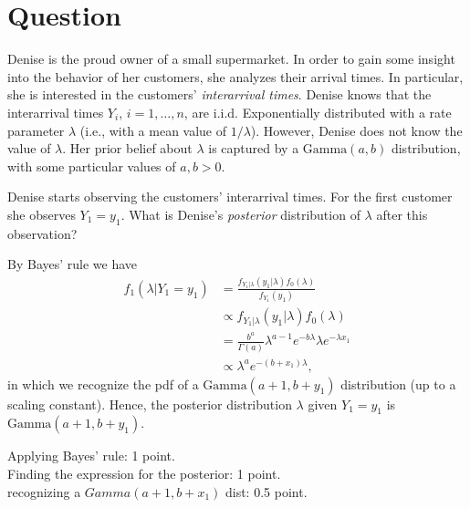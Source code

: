 \section*{Question}

Denise is the proud owner of a small supermarket. In order to gain some insight into the behavior of her customers, she analyzes their arrival times. In particular, she is interested in the customers' \textit{interarrival times}. Denise knows that the interarrival times $Y_i$, $i=1,\ldots,n$, are i.i.d. Exponentially distributed with a rate parameter $\lambda$ (i.e., with a mean value of $1/\lambda$). However, Denise does not know the value of $\lambda$. Her prior belief about $\lambda$ is captured by a $\text{Gamma}(a,b)$ distribution, with some particular values of $a,b > 0$.

\begin{exercise}[2.5]
Denise starts observing the customers' interarrival times. For the first customer she observes $Y_1 = y_1$. What is Denise's \textit{posterior} distribution of $\lambda$ after this observation?
\begin{solution}
By Bayes' rule we have
\begin{align}
    f_1(\lambda|Y_1 = y_1) &= \frac{f_{Y_1|\lambda}(y_1|\lambda) f_0(\lambda)}{f_{Y_1}(y_1)} \\
    &\propto f_{Y_1|\lambda}(y_1|\lambda) f_0(\lambda) \\
    &= \frac{b^a}{\Gamma(a)}\lambda^{a-1} e^{-b\lambda} \lambda e^{-\lambda x_1} \\
    &\propto \lambda^{a} e^{-(b + x_1)\lambda},
\end{align}
in which we recognize the pdf of a $\text{Gamma}(a+1,b+y_1)$ distribution (up to a scaling constant). Hence, the posterior distribution $\lambda$ given $Y_1 = y_1$ is $\text{Gamma}(a+1,b+y_1)$.

Applying Bayes' rule: 1 point.\\
Finding the expression for the posterior: 1 point.\\
recognizing a $Gamma(a+1,b+x_1)$ dist: 0.5 point.
\end{solution}
\end{exercise}



